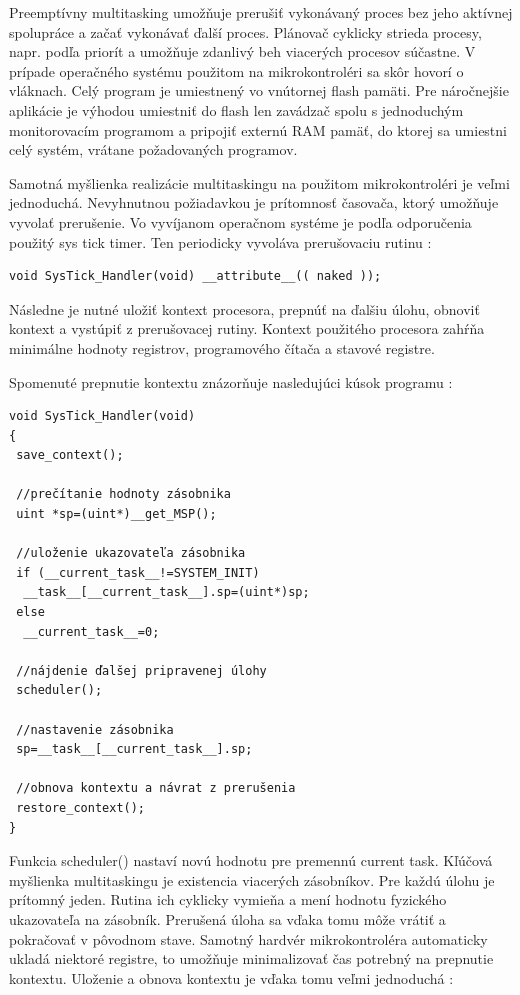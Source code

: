 \documentclass[twoside]{oss-conf}
\begin{document}
	
	Preemptívny multitasking umožňuje prerušiť vykonávaný proces bez jeho aktívnej spolupráce a začať vykonávať ďalší proces. Plánovač cyklicky strieda procesy, napr. podľa priorít a umožňuje zdanlivý beh viacerých procesov súčastne. V prípade operačného systému použitom na mikrokontroléri sa skôr hovorí o vláknach. 
	Celý program je umiestnený vo vnútornej flash pamäti. Pre náročnejšie aplikácie je výhodou umiestniť do flash len zavádzač spolu s jednoduchým monitorovacím programom a pripojiť externú RAM pamäť, do ktorej sa umiestni celý systém, vrátane požadovaných programov.

	Samotná myšlienka realizácie multitaskingu na použitom mikrokontroléri je veľmi jednoduchá. Nevyhnutnou požiadavkou je prítomnosť časovača, ktorý umožňuje vyvolať prerušenie. 
	Vo vyvíjanom operačnom systéme je podľa odporučenia použitý sys tick timer. Ten periodicky vyvoláva prerušovaciu rutinu :

\begin{verbatim}
void SysTick_Handler(void) __attribute__(( naked ));
\end{verbatim}

Následne je nutné uložiť kontext procesora, prepnúť na ďalšiu úlohu, obnoviť kontext a vystúpiť z prerušovacej rutiny. Kontext použitého procesora zahŕňa minimálne hodnoty registrov, programového čítača a stavové registre.


	Spomenuté prepnutie kontextu znázorňuje nasledujúci kúsok programu :

{\small
\begin{verbatim}
void SysTick_Handler(void) 
{ 
 save_context(); 
 
 //prečítanie hodnoty zásobnika
 uint *sp=(uint*)__get_MSP();		

 //uloženie ukazovateľa zásobnika
 if (__current_task__!=SYSTEM_INIT)
  __task__[__current_task__].sp=(uint*)sp; 
 else 
  __current_task__=0;

 //nájdenie ďalšej pripravenej úlohy
 scheduler(); 					

 //nastavenie zásobnika
 sp=__task__[__current_task__].sp;		

 //obnova kontextu a návrat z prerušenia
 restore_context(); 				
}
\end{verbatim}
}
Funkcia scheduler() nastaví novú hodnotu pre premennú current task. Kľúčová myšlienka multitaskingu je existencia viacerých zásobníkov. Pre každú úlohu je prítomný jeden. Rutina ich cyklicky vymieňa a mení hodnotu fyzického ukazovateľa na zásobník. Prerušená úloha sa vďaka tomu môže vrátiť a pokračovať v pôvodnom stave. Samotný hardvér mikrokontroléra automaticky ukladá niektoré registre, to umožňuje minimalizovať čas potrebný na prepnutie kontextu. Uloženie a obnova kontextu je vďaka tomu veľmi jednoduchá :
\end{document}
